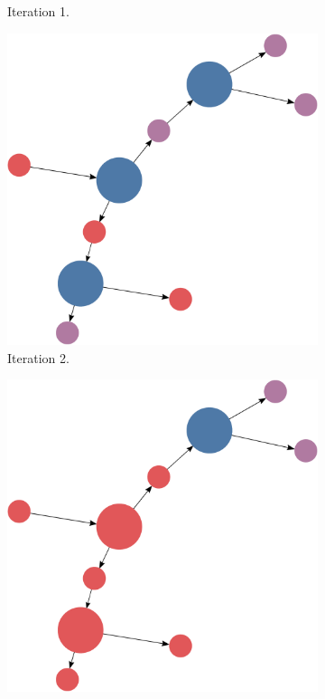\documentclass[titlepage,11pt]{article}
\begin{document}
\begin{figure}[!htb]
\begin{subfigure}[!htb]{0.19\textwidth}
		\caption{Iteration 1.}
	\end{subfigure}
	\begin{subfigure}[!htb]{0.19\textwidth}
		\centering
		\includegraphics[width=\columnwidth]{figures/knn_simple_lambda_think_2.pdf}
		\caption{Iteration 2.}
	\end{subfigure}
	\begin{subfigure}[!htb]{0.19\textwidth}
		\centering
		\includegraphics[width=\columnwidth]{figures/knn_simple_lambda_think_3.pdf}

\end{subfigure}
\end{figure}
\end{document}
